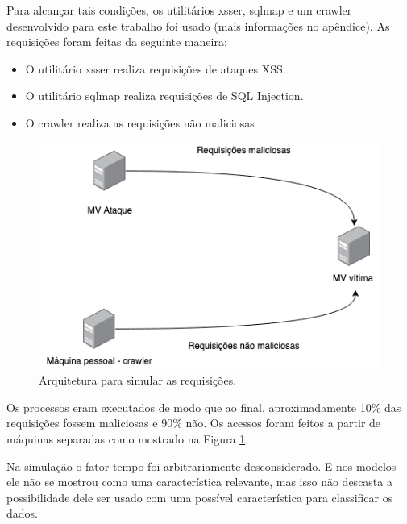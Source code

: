 Para alcançar tais condições, os utilitários xsser, sqlmap e um crawler desenvolvido para 
este trabalho foi usado (mais informações no apêndice). As requisições foram feitas da seguinte maneira:

\begin{itemize}
    \item O utilitário xsser realiza requisições de ataques XSS.
    \item O utilitário sqlmap realiza requisições de SQL Injection.
    \item O crawler realiza as requisições não maliciosas
\end{itemize}

\begin{figure}
    \centering
    \includegraphics[width=.7\textwidth]{figuras/arquitetura_ataque.png}
    \caption{Arquitetura para simular as requisições. \label{fig:arquitetura_ataque}}    
\end{figure}

Os processos eram executados de modo que ao final, aproximadamente 10\% das requisições 
fossem maliciosas e 90\% não. Os acessos foram feitos a partir de máquinas separadas como 
mostrado na Figura \ref{fig:arquitetura_ataque}.

Na simulação o fator tempo foi arbitrariamente desconsiderado. E nos modelos ele não se mostrou 
como uma característica relevante, mas isso não descasta a possibilidade dele ser usado com uma possível
característica para classificar os dados.

